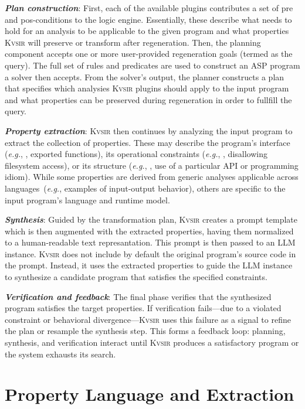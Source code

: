 \documentclass[noacm,sigplan]{acmart}
\def\eg{{\em e.g.}, }
\newcommand{\sys}{{\scshape Kv{\textalpha}sir}\xspace}
\newcommand{\heading}[1]{\vspace{2pt}\noindent\textbf{\emph{#1}}:\enspace}
\begin{document}
\heading{Plan construction}
First, each of the available plugins contributes a set of pre and pos-conditions 
to the logic engine.
Essentially, these describe what needs to hold for an analysis to be applicable to the given 
program and what properties \sys will preserve or transform after regeneration.
Then, the planning component accepts one or more user-provided regeneration goals (termed as the query).
The full set of rules and predicates are used to construct an ASP program
a solver then accepts.
From the solver's output, the planner constructs a plan that specifies which
analysies \sys plugins should apply to the input program and what properties can be
preserved during regeneration in order to fullfill the query.

\heading{Property extraction} \sys then continues by analyzing the input program to
extract the collection of properties.
These may describe the program's interface
(\eg, exported functions), its operational constraints (\eg, disallowing
filesystem access), or its structure (\eg, use of a particular API or programming idiom).
While some properties are derived from generic analyses
applicable across languages~(\eg examples of input-output behavior), others are specific to the input program's language and runtime model.

\heading{Synthesis}
Guided by the transformation plan, \sys creates a prompt template which is then
augmented with the extracted properties, having them normalized to a human-readable text represantation.
This prompt is then passed to an LLM instance.
\sys does not include by default the original program's source code in the prompt.
Instead, it uses the extracted properties to guide the LLM instance 
to synthesize a candidate program that satisfies the specified constraints.

\heading{Verification and feedback}
The final phase verifies that the
synthesized program satisfies the target properties.
If verification fails---due to a violated constraint or behavioral divergence---\sys uses this
failure as a signal to refine the plan or resample the synthesis step.
This forms a feedback loop: planning, synthesis, and verification interact until \sys
produces a satisfactory program or the system exhausts its search.

\section{Property Language and Extraction}
\label{sec:dsl}
\end{document}

